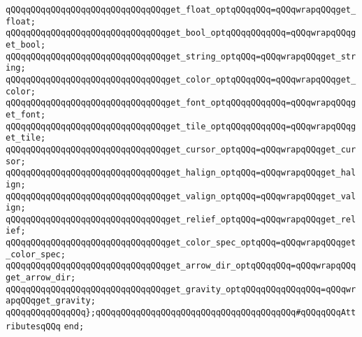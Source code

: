 \verb|qQQqqQQqqQQqqQQqqQQqqQQqqQQqqQQqget_float_optqQQqqQQq=qQQqwrapqQQqget_float;|\newline
\verb|qQQqqQQqqQQqqQQqqQQqqQQqqQQqqQQqget_bool_optqQQqqQQqqQQq=qQQqwrapqQQqget_bool;|\newline
\verb|qQQqqQQqqQQqqQQqqQQqqQQqqQQqqQQqget_string_optqQQq=qQQqwrapqQQqget_string;|\newline
\verb|qQQqqQQqqQQqqQQqqQQqqQQqqQQqqQQqget_color_optqQQqqQQq=qQQqwrapqQQqget_color;|\newline
\verb|qQQqqQQqqQQqqQQqqQQqqQQqqQQqqQQqget_font_optqQQqqQQqqQQq=qQQqwrapqQQqget_font;|\newline
\verb|qQQqqQQqqQQqqQQqqQQqqQQqqQQqqQQqget_tile_optqQQqqQQqqQQq=qQQqwrapqQQqget_tile;|\newline
\verb|qQQqqQQqqQQqqQQqqQQqqQQqqQQqqQQqget_cursor_optqQQq=qQQqwrapqQQqget_cursor;|\newline
\verb|qQQqqQQqqQQqqQQqqQQqqQQqqQQqqQQqget_halign_optqQQq=qQQqwrapqQQqget_halign;|\newline
\verb|qQQqqQQqqQQqqQQqqQQqqQQqqQQqqQQqget_valign_optqQQq=qQQqwrapqQQqget_valign;|\newline
\verb|qQQqqQQqqQQqqQQqqQQqqQQqqQQqqQQqget_relief_optqQQq=qQQqwrapqQQqget_relief;|\newline
\newline
\verb|qQQqqQQqqQQqqQQqqQQqqQQqqQQqqQQqget_color_spec_optqQQq=qQQqwrapqQQqget_color_spec;|\newline
\verb|qQQqqQQqqQQqqQQqqQQqqQQqqQQqqQQqget_arrow_dir_optqQQqqQQq=qQQqwrapqQQqget_arrow_dir;|\newline
\verb|qQQqqQQqqQQqqQQqqQQqqQQqqQQqqQQqget_gravity_optqQQqqQQqqQQqqQQq=qQQqwrapqQQqget_gravity;|\newline
\newline
\verb|qQQqqQQqqQQqqQQq};qQQqqQQqqQQqqQQqqQQqqQQqqQQqqQQqqQQqqQQq#qQQqqQQqAttributesqQQq|\newline
\newline
\verb|end;|\newline
\newline

